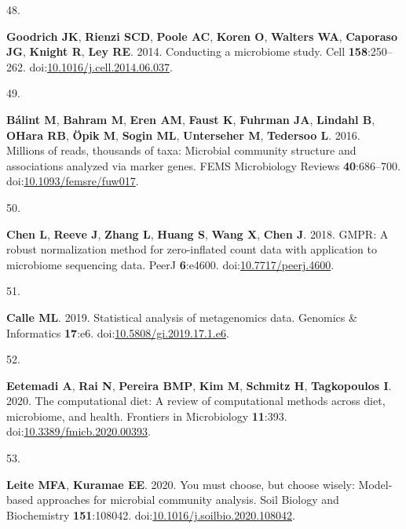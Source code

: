 \documentclass[
]{article}
\newlength{\cslhangindent}
\newlength{\csllabelwidth}
\newlength{\cslentryspacingunit} %
\newenvironment{CSLReferences}[2] %
 {%
  \setlength{\parindent}{0pt}
  \ifodd #1
  \let\oldpar\par
  \def\par{\hangindent=\cslhangindent\oldpar}
  \fi
  \setlength{\parskip}{#2\cslentryspacingunit}
 }%
 {}
\newcommand{\CSLLeftMargin}[1]{\parbox[t]{\csllabelwidth}{#1}}
\newcommand{\CSLRightInline}[1]{\parbox[t]{\linewidth - \csllabelwidth}{#1}\break}
\begin{document}
\begin{CSLReferences}{0}{1}
\leavevmode{}%
\CSLLeftMargin{48. }%
\CSLRightInline{\textbf{Goodrich JK}, \textbf{Rienzi SCD}, \textbf{Poole
AC}, \textbf{Koren O}, \textbf{Walters WA}, \textbf{Caporaso JG},
\textbf{Knight R}, \textbf{Ley RE}. 2014. Conducting a microbiome study.
Cell \textbf{158}:250--262.
doi:\href{https://doi.org/10.1016/j.cell.2014.06.037}{10.1016/j.cell.2014.06.037}.}

\leavevmode{}%
\CSLLeftMargin{49. }%
\CSLRightInline{\textbf{Bálint M}, \textbf{Bahram M}, \textbf{Eren AM},
\textbf{Faust K}, \textbf{Fuhrman JA}, \textbf{Lindahl B}, \textbf{OHara
RB}, \textbf{Öpik M}, \textbf{Sogin ML}, \textbf{Unterseher M},
\textbf{Tedersoo L}. 2016. Millions of reads, thousands of taxa:
Microbial community structure and associations analyzed via marker
genes. {FEMS} Microbiology Reviews \textbf{40}:686--700.
doi:\href{https://doi.org/10.1093/femsre/fuw017}{10.1093/femsre/fuw017}.}

\leavevmode{}%
\CSLLeftMargin{50. }%
\CSLRightInline{\textbf{Chen L}, \textbf{Reeve J}, \textbf{Zhang L},
\textbf{Huang S}, \textbf{Wang X}, \textbf{Chen J}. 2018. {GMPR}: A
robust normalization method for zero-inflated count data with
application to microbiome sequencing data. {PeerJ} \textbf{6}:e4600.
doi:\href{https://doi.org/10.7717/peerj.4600}{10.7717/peerj.4600}.}

\leavevmode{}%
\CSLLeftMargin{51. }%
\CSLRightInline{\textbf{Calle ML}. 2019. Statistical analysis of
metagenomics data. Genomics {\&} Informatics \textbf{17}:e6.
doi:\href{https://doi.org/10.5808/gi.2019.17.1.e6}{10.5808/gi.2019.17.1.e6}.}

\leavevmode{}%
\CSLLeftMargin{52. }%
\CSLRightInline{\textbf{Eetemadi A}, \textbf{Rai N}, \textbf{Pereira
BMP}, \textbf{Kim M}, \textbf{Schmitz H}, \textbf{Tagkopoulos I}. 2020.
The computational diet: A review of computational methods across diet,
microbiome, and health. Frontiers in Microbiology \textbf{11}:393.
doi:\href{https://doi.org/10.3389/fmicb.2020.00393}{10.3389/fmicb.2020.00393}.}

\leavevmode{}%
\CSLLeftMargin{53. }%
\CSLRightInline{\textbf{Leite MFA}, \textbf{Kuramae EE}. 2020. You must
choose, but choose wisely: Model-based approaches for microbial
community analysis. Soil Biology and Biochemistry \textbf{151}:108042.
doi:\href{https://doi.org/10.1016/j.soilbio.2020.108042}{10.1016/j.soilbio.2020.108042}.}


\end{CSLReferences}
\end{document}
